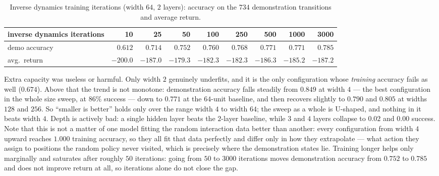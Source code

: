 \documentclass[12pt]{article}%
\begin{document}
\begin{table}[h]
\centering
\small
\caption{Inverse dynamics training iterations (width $64$, $2$ layers): accuracy on the
$734$ demonstration transitions and average return.}
\label{tab:p7iters}
\setlength{\tabcolsep}{4pt}
\begin{tabular}{@{}l*{8}{r}@{}}
\toprule
inverse dynamics iterations & 10 & 25 & 50 & 100 & 250 & 500 & 1000 & 3000 \\
\midrule
demo accuracy & $0.612$ & $0.714$ & $0.752$ & $0.760$ & $0.768$ & $0.771$ & $0.771$ & $0.785$ \\
avg.\ return & $-200.0$ & $-187.0$ & $-179.3$ & $-182.3$ & $-182.3$ & $-186.3$ & $-185.2$ & $-187.2$ \\
\bottomrule
\end{tabular}
\end{table}

Extra capacity was useless or harmful. Only width $2$ genuinely underfits, and it is the
only configuration whose \emph{training} accuracy fails as well ($0.674$). Above that the
trend is not monotone: demonstration accuracy falls steadily from $0.849$ at width $4$ ---
the best configuration in the whole size sweep, at $86\%$ success --- down to $0.771$ at the
$64$-unit baseline, and then recovers slightly to $0.790$ and $0.805$ at widths $128$ and
$256$. So ``smaller is better'' holds only over the range width $4$ to width $64$; the
sweep as a whole is U-shaped, and nothing in it beats width $4$.
Depth is actively bad: a single hidden layer beats the $2$-layer baseline, while $3$ and $4$
layers collapse to $0.02$ and $0.00$ success. Note that this is not a matter of one model
fitting the random interaction data better than another: every configuration from width $4$
upward reaches $1.000$ training accuracy, so they all fit that data perfectly and differ
only in how they extrapolate --- what action they assign to positions the random policy
never visited, which is precisely where the demonstration states lie. Training
longer helps only marginally and saturates after roughly $50$ iterations: going from $50$ to
$3000$ iterations moves demonstration accuracy from $0.752$ to $0.785$ and does not improve
return at all, so iterations alone do not close the gap.
\end{document}

